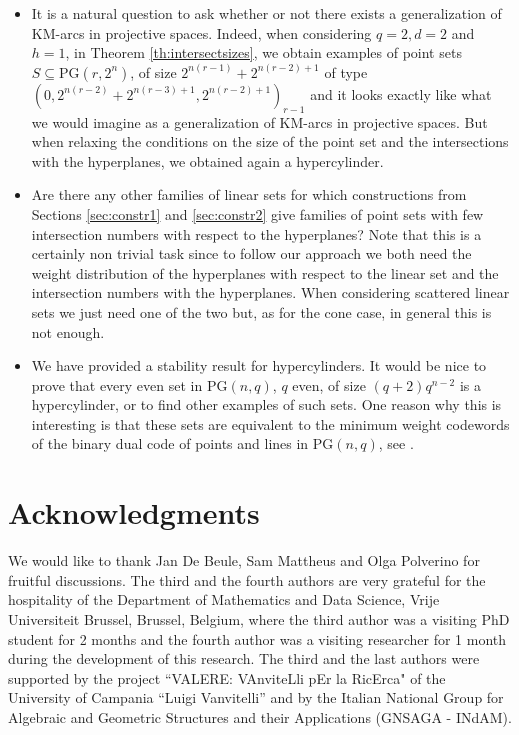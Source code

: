 \documentclass[11pt]{amsart}
\newcommand{\PG}{\mathrm{PG}}
\begin{document}
\begin{itemize}
    \item It is a natural question to ask whether or not there exists a generalization of KM-arcs in projective spaces. Indeed, when considering $q=2,d=2$ and $h=1$, in Theorem \ref{th:intersectsizes}, we obtain examples of point sets $S \subseteq \PG(r,2^n)$, of size $2^{n(r-1)}+2^{n(r-2)+1}$ of type $(0,2^{n(r-2)}+2^{n(r-3)+1},2^{n(r-2)+1})_{r-1}$ and it looks exactly like what we would imagine as a generalization of KM-arcs in projective spaces. But when relaxing the conditions on the size of the point set and the intersections with the hyperplanes, we obtained again a hypercylinder. 
    \item Are there any other families of linear sets for which constructions from Sections \ref{sec:constr1} and \ref{sec:constr2} give families of point sets with few intersection numbers with respect to the hyperplanes? Note that this is a certainly non trivial task since to follow our approach we both need the weight distribution of the hyperplanes with respect to the linear set and the intersection numbers with the hyperplanes. When considering scattered linear sets we just need one of the two but, as for the cone case, in general this is not enough.
    \item We have provided a stability result for hypercylinders. It would be nice to prove that every even set in $\PG(n,q)$, $q$ even, of size $(q+2)q^{n-2}$ is a hypercylinder, or to find other examples of such sets.
    One reason why this is interesting is that these sets are equivalent to the minimum weight codewords of the binary dual code of points and lines in $\PG(n,q)$, see \cite{calkin1999minimumweight}.
\end{itemize}


\section*{Acknowledgments}

We would like to thank Jan De Beule, Sam Mattheus and Olga Polverino for fruitful discussions. The third and the fourth authors are very grateful for the hospitality of the Department of Mathematics and Data Science, Vrije Universiteit Brussel, Brussel, Belgium, where the third author was a visiting PhD student for 2 months and the fourth author was a visiting researcher for 1 month during the development of this research.
The third and the last authors were supported by the project ``VALERE: VAnviteLli pEr la RicErca" of the University of Campania ``Luigi Vanvitelli'' and by the Italian National Group for Algebraic and Geometric Structures and their Applications (GNSAGA - INdAM).



\end{document}
